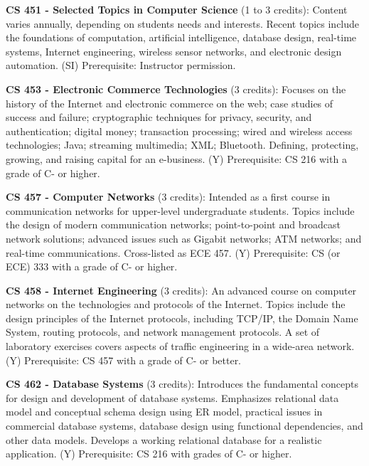 \documentclass[12pt,twoside]{article}
\begin{document}

{\bf\noindent CS 451 - Selected Topics in Computer Science} (1 to 3
credits): Content varies annually, depending on students needs and
interests. Recent topics include the foundations of computation,
artificial intelligence, database design, real-time systems, Internet
engineering, wireless sensor networks, and electronic design
automation. (SI) Prerequisite: Instructor permission.

{\bf\noindent CS 453 - Electronic Commerce Technologies} (3 credits):
Focuses on the history of the Internet and electronic commerce on the
web; case studies of success and failure; cryptographic techniques for
privacy, security, and authentication; digital money; transaction
processing; wired and wireless access technologies; Java; streaming
multimedia; XML; Bluetooth. Defining, protecting, growing, and raising
capital for an e-business. (Y) Prerequisite: CS 216 with a grade of C-
or higher.

{\bf\noindent CS 457 - Computer Networks} (3 credits): Intended as a
first course in communication networks for upper-level undergraduate
students. Topics include the design of modern communication networks;
point-to-point and broadcast network solutions; advanced issues such
as Gigabit networks; ATM networks; and real-time communications.
Cross-listed as ECE 457. (Y) Prerequisite: CS (or ECE) 333 with a
grade of C- or higher.

{\bf\noindent CS 458 - Internet Engineering} (3 credits): An advanced
course on computer networks on the technologies and protocols of the
Internet. Topics include the design principles of the Internet
protocols, including TCP/IP, the Domain Name System, routing
protocols, and network management protocols. A set of laboratory
exercises covers aspects of traffic engineering in a wide-area
network. (Y) Prerequisite: CS 457 with a grade of C- or better.

{\bf\noindent CS 462 - Database Systems} (3 credits): Introduces the
fundamental concepts for design and development of database
systems. Emphasizes relational data model and conceptual schema design
using ER model, practical issues in commercial database systems,
database design using functional dependencies, and other data
models. Develops a working relational database for a realistic
application. (Y) Prerequisite: CS 216 with grades of C- or higher.
\end{document}
